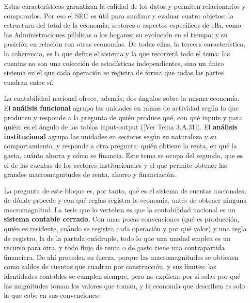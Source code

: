\documentclass[10pt,a4paper]{article}
\newcommand{\authorfont}[1]{{\fontfamily{EBGaramond-TLF}\selectfont #1}}
\begin{document}
Estas características garantizan la calidad de los datos y permiten relacionarlos y compararlos. Por eso el SEC es útil para analizar y evaluar cuatro objetos: la estructura del total de la economía; sectores o aspectos específicos de ella, como las Administraciones públicas o los hogares; su evolución en el tiempo; y su posición en relación con otras economías. De todas ellas, la tercera característica, la coherencia, es la que define el sistema y la que recorrerá todo el tema: las cuentas no son una colección de estadísticas independientes, sino un único sistema en el que cada operación se registra de forma que todas las partes cuadran entre sí.

La contabilidad nacional ofrece, además, dos ángulos sobre la misma economía. El \textbf{análisis funcional} agrupa las unidades en ramas de actividad según lo que producen y responde a la pregunta de quién produce qué, con qué inputs y para quién: es el ángulo de las tablas input-output ([\authorfont{Ver Tema 3.A.31}]). El \textbf{análisis institucional} agrupa las unidades en sectores según su naturaleza y su comportamiento, y responde a otra pregunta: quién obtiene la renta, en qué la gasta, cuánto ahorra y cómo se financia. Este tema se ocupa del segundo, que es el de las cuentas de los sectores institucionales y el que permite obtener las grandes macromagnitudes de renta, ahorro y financiación.

La pregunta de este bloque es, por tanto, qué es el sistema de cuentas nacionales, de dónde procede y con qué reglas registra la economía, antes de obtener ninguna macromagnitud. La tesis que lo vertebra es que la contabilidad nacional es un \textbf{sistema contable cerrado}. Con unas pocas convenciones (qué es producción, quién es residente, cuándo se registra cada operación y por qué valor) y una regla de registro, la de la partida cuádruple, todo lo que una unidad emplea es un recurso para otra, y todo flujo de renta o de gasto tiene una contrapartida financiera. De ahí proceden su fuerza, porque las macromagnitudes se obtienen como saldos de cuentas que cuadran por construcción, y sus límites: las identidades contables se cumplen siempre, pero no explican por sí solas por qué las magnitudes toman los valores que toman, y la economía que describen es solo la que cabe en sus convenciones.
\end{document}
